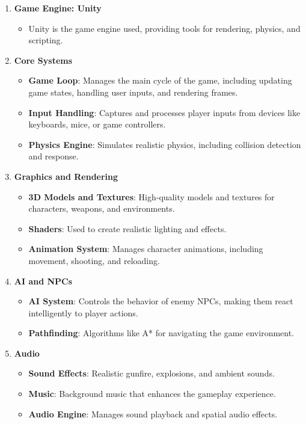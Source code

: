 \begin{enumerate}
	\item \textbf{Game Engine: Unity}
	\begin{itemize}
		\item Unity is the game engine used, providing tools for rendering, physics, and scripting.
	\end{itemize}
	
	\item \textbf{Core Systems}
	\begin{itemize}
		\item \textbf{Game Loop}: Manages the main cycle of the game, including updating game states, handling user inputs, and rendering frames.
		\item \textbf{Input Handling}: Captures and processes player inputs from devices like keyboards, mice, or game controllers.
		\item \textbf{Physics Engine}: Simulates realistic physics, including collision detection and response.
	\end{itemize}
	
	\item \textbf{Graphics and Rendering}
	\begin{itemize}
		\item \textbf{3D Models and Textures}: High-quality models and textures for characters, weapons, and environments.
		\item \textbf{Shaders}: Used to create realistic lighting and effects.
		\item \textbf{Animation System}: Manages character animations, including movement, shooting, and reloading.
	\end{itemize}
	
	\item \textbf{AI and NPCs}
	\begin{itemize}
		\item \textbf{AI System}: Controls the behavior of enemy NPCs, making them react intelligently to player actions.
		\item \textbf{Pathfinding}: Algorithms like A* for navigating the game environment.
	\end{itemize}
	
	\item \textbf{Audio}
	\begin{itemize}
		\item \textbf{Sound Effects}: Realistic gunfire, explosions, and ambient sounds.
		\item \textbf{Music}: Background music that enhances the gameplay experience.
		\item \textbf{Audio Engine}: Manages sound playback and spatial audio effects.
	\end{itemize}
	

\end{enumerate}
